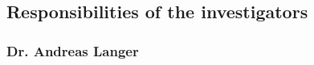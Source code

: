 \documentclass[enabledeprecatedfontcommands,cleardoublepage=empty,headsepline,twoside,11pt,DIV=15,BCOR=12mm,final]{scrartcl}
\begin{document}
%
%


\subsection{Responsibilities of the investigators}


\subsubsection{Dr. Andreas Langer}
\end{document}
